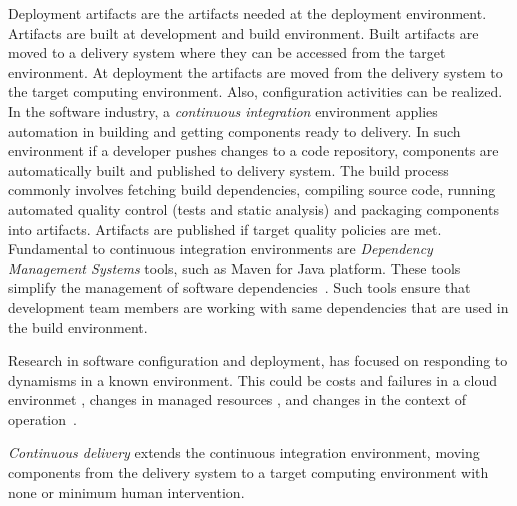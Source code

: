 Deployment artifacts are the artifacts needed at the deployment environment. Artifacts are built at development and build environment. Built artifacts are moved to a delivery system where they can be accessed from the target environment. At deployment the artifacts are moved from the delivery system to the target computing environment. Also, configuration activities can be realized.
In the software industry, a \emph{continuous integration}\cite{humble_continuous_2010} environment applies automation in building and getting components ready to delivery. In such environment if a developer pushes changes to a code repository, components are automatically built and published to delivery system. The build process commonly involves fetching build dependencies, compiling source code, running automated quality control (tests and static analysis) and packaging components into artifacts. Artifacts are published if target quality policies are met.
Fundamental to continuous integration environments are \emph{Dependency Management Systems} tools, such as Maven\cite{apache_apache_2016} for Java platform. These tools simplify the management of software dependencies~\cite{spinellis_package_2012}. Such tools ensure that development team members are working with same dependencies that are used in the build environment.

Research in software configuration and deployment, has focused on responding to dynamisms in a known environment. This could be costs and failures in a cloud environmet \cite{ferreira_leite_user_2014}, changes in managed resources \citep{gunalp_rondo_2015}, and changes in the context of operation~\cite{bencomo_dynamically_2008}.

\emph{Continuous delivery}\cite{humble_continuous_2010} extends the continuous integration environment, moving components from the delivery system to a target computing environment with none or minimum human intervention.

